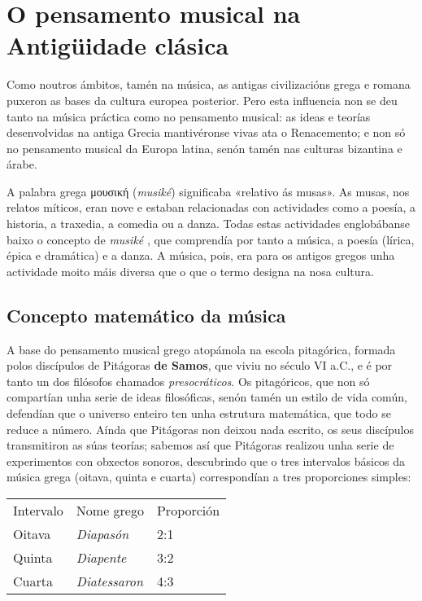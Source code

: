 
\hypertarget{o-pensamento-musical--na-antiguxfcidade-cluxe1sica}{%
\section{O pensamento musical na Antigüidade
clásica}\label{o-pensamento-musical--na-antiguxfcidade-cluxe1sica}}

Como noutros ámbitos, tamén na música, as antigas civilizacións grega e
romana puxeron as bases da cultura europea posterior. Pero esta
influencia non se deu tanto na música práctica como no pensamento
musical: as ideas e teorías desenvolvidas na antiga Grecia mantivéronse
vivas ata o Renacemento; e non só no pensamento musical da Europa
latina, senón tamén nas culturas bizantina e árabe.

A palabra grega μουσική (\emph{musiké}) significaba «relativo ás musas».
As musas, nos relatos míticos, eran nove e estaban relacionadas con
actividades como a poesía, a historia, a traxedia, a comedia ou a danza.
Todas estas actividades englobábanse baixo o concepto de \emph{musiké} ,
que comprendía por tanto a música, a poesía (lírica, épica e dramática)
e a danza. A música, pois, era para os antigos gregos unha actividade
moito máis diversa que o que o termo designa na nosa cultura.

\hypertarget{concepto-matemuxe1tico-da-muxfasica}{%
\subsection*{Concepto matemático da
música}\label{concepto-matemuxe1tico-da-muxfasica}}

A base do pensamento musical grego atopámola na escola pitagórica,
formada polos discípulos de Pitágoras \textbf{de Samos}, que viviu no
século VI a.C., e é por tanto un dos filósofos chamados
\emph{presocráticos}. Os pitagóricos, que non só compartían unha serie
de ideas filosóficas, senón tamén un estilo de vida común, defendían que
o universo enteiro ten unha estrutura matemática, que todo se reduce a
número. Aínda que Pitágoras non deixou nada escrito, os seus discípulos
transmitiron as súas teorías; sabemos así que Pitágoras realizou unha
serie de experimentos con obxectos sonoros, descubrindo que o tres
intervalos básicos da música grega (oitava, quinta e cuarta)
correspondían a tres proporciones simples:

\begin{center}
\begin{tabular}{lll}
Intervalo & Nome grego & Proporción \\
Oitava & \emph{Diapasón} & 2:1 \\
Quinta & \emph{Diapente} & 3:2 \\
Cuarta & \emph{Diatessaron} & 4:3 \\
\end{tabular}
\end{center}

